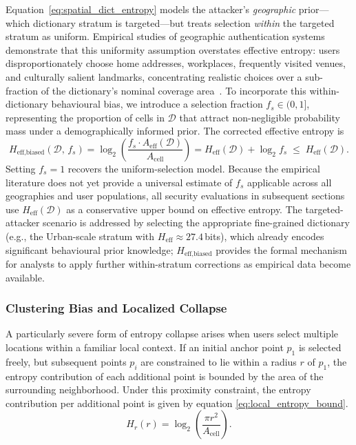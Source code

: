 \documentclass[journal,article,accept,pdftex,moreauthors]{Definitions/mdpi}
\begin{document}
Equation~\ref{eq:spatial_dict_entropy} models the attacker's \emph{geographic} prior---which dictionary stratum is targeted---but treats selection \emph{within} the targeted stratum as uniform. Empirical studies of geographic authentication systems demonstrate that this uniformity assumption overstates effective entropy: users disproportionately choose home addresses, workplaces, frequently visited venues, and culturally salient landmarks, concentrating realistic choices over a sub-fraction of the dictionary's nominal coverage area~\cite{Sun2012,Thorpe2013,AlAmeen2014}. To incorporate this within-dictionary behavioural bias, we introduce a selection fraction $f_s \in (0,1]$, representing the proportion of cells in $\mathcal{D}$ that attract non-negligible probability mass under a demographically informed prior. The corrected effective entropy is
\begin{equation}
H_{\text{eff,biased}}(\mathcal{D},\,f_s)
  = \log_2\!\left(\frac{f_s \cdot A_{\text{eff}}(\mathcal{D})}{A_{\text{cell}}}\right)
  = H_{\text{eff}}(\mathcal{D}) + \log_2 f_s \;\leq\; H_{\text{eff}}(\mathcal{D}).
\label{eq:biased_entropy}
\end{equation}
Setting $f_s = 1$ recovers the uniform-selection model. Because the empirical literature does not yet provide a universal estimate of $f_s$ applicable across all geographies and user populations, all security evaluations in subsequent sections use $H_{\text{eff}}(\mathcal{D})$ as a conservative upper bound on effective entropy. The targeted-attacker scenario is addressed by selecting the appropriate fine-grained dictionary (e.g., the Urban-scale stratum with $H_{\text{eff}} \approx 27.4$\,bits), which already encodes significant behavioural prior knowledge; $H_{\text{eff,biased}}$ provides the formal mechanism for analysts to apply further within-stratum corrections as empirical data become available.


\subsubsection{Clustering Bias and Localized Collapse}
\label{sec:clustering}

A particularly severe form of entropy collapse arises when users select multiple locations within a familiar local context. If an initial anchor point $p_1$ is selected freely, but subsequent points $p_i$ are constrained to lie within a radius $r$ of $p_1$, the entropy contribution of each additional point is bounded by the area of the surrounding neighborhood. Under this proximity constraint, the entropy contribution per additional point is given by equation \ref{eq:local_entropy_bound}.
\begin{equation}
H_r(r) = \log_2\!\left(\frac{\pi r^2}{A_{\text{cell}}}\right).
\label{eq:local_entropy_bound}
\end{equation}
\end{document}
